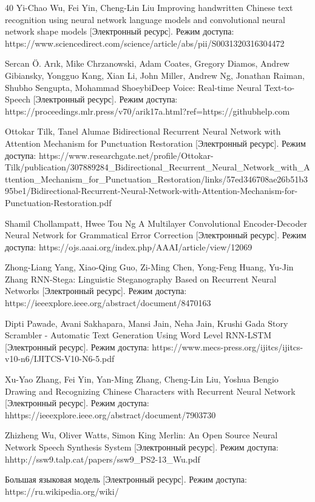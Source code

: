 \documentclass{article}
\begin{document}
\begin{thebibliography} {40}
Yi-Chao Wu, Fei Yin, Cheng-Lin Liu Improving handwritten Chinese text recognition using neural network language models and convolutional neural network shape models [Электронный ресурс]. Режим доступа: https://www.sciencedirect.com/science/article/abs/pii/S0031320316304472

Sercan Ö. Arık, Mike Chrzanowski, Adam Coates, Gregory Diamos, Andrew Gibiansky, Yongguo Kang, Xian Li, John Miller, Andrew Ng, Jonathan Raiman, Shubho Sengupta, Mohammad ShoeybiDeep Voice: Real-time Neural Text-to-Speech [Электронный ресурс].
Режим доступа: https://proceedings.mlr.press/v70/arik17a.html?ref=https://githubhelp.com

Ottokar Tilk, Tanel Alumae Bidirectional Recurrent Neural Network with Attention Mechanism for
Punctuation Restoration [Электронный ресурс]. Режим доступа: https://www.researchgate.net/profile/Ottokar-Tilk/publication/307889284_Bidirectional_Recurrent_Neural_Network_with_Attention_Mechanism_for_Punctuation_Restoration/links/57ed346708ae26b51b395be1/Bidirectional-Recurrent-Neural-Network-with-Attention-Mechanism-for-Punctuation-Restoration.pdf

Shamil Chollampatt, Hwee Tou Ng A Multilayer Convolutional Encoder-Decoder Neural Network for Grammatical Error Correction [Электронный ресурс]. Режим доступа: https://ojs.aaai.org/index.php/AAAI/article/view/12069

Zhong-Liang Yang, Xiao-Qing Guo, Zi-Ming Chen, Yong-Feng Huang, Yu-Jin Zhang RNN-Stega: Linguistic Steganography Based on Recurrent Neural Networks [Электронный ресурс]. Режим доступа: https://ieeexplore.ieee.org/abstract/document/8470163

Dipti Pawade, Avani Sakhapara, Mansi Jain, Neha Jain, Krushi Gada Story Scrambler - Automatic Text Generation Using Word Level RNN-LSTM [Электронный ресурс]. Режим доступа: https://www.mecs-press.org/ijitcs/ijitcs-v10-n6/IJITCS-V10-N6-5.pdf

Xu-Yao Zhang, Fei Yin, Yan-Ming Zhang, Cheng-Lin Liu, Yoshua Bengio Drawing and Recognizing Chinese Characters with Recurrent Neural Network [Электронный ресурс]. Режим доступа: hhttps://ieeexplore.ieee.org/abstract/document/7903730

Zhizheng Wu, Oliver Watts, Simon King Merlin: An Open Source Neural Network Speech Synthesis System [Электронный ресурс]. Режим доступа: hhttp://ssw9.talp.cat/papers/ssw9_PS2-13_Wu.pdf

Большая языковая модель [Электронный ресурс]. Режим доступа: https://ru.wikipedia.org/wiki/%

\end{thebibliography}
\end{document}
